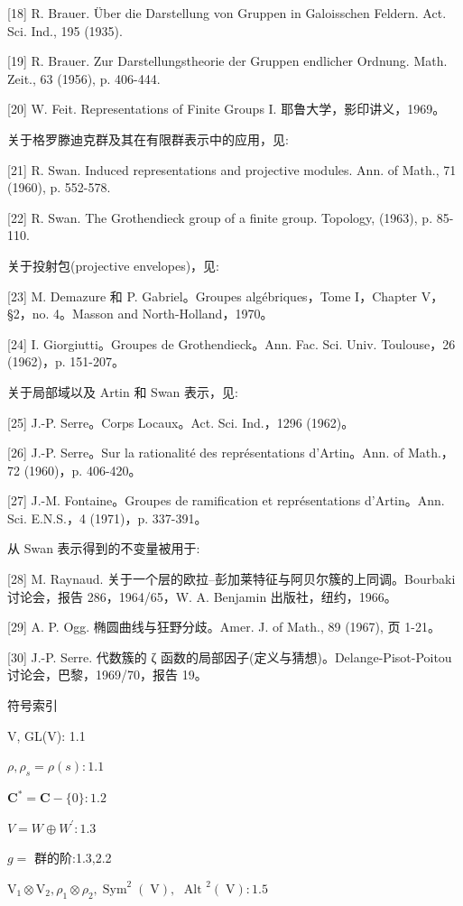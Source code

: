 \documentclass[10pt]{article}
\begin{document}
[18] R. Brauer. Über die Darstellung von Gruppen in Galoisschen Feldern. Act. Sci. Ind., 195 (1935).

[19] R. Brauer. Zur Darstellungstheorie der Gruppen endlicher Ordnung. Math. Zeit., 63 (1956), p. 406-444.

[20] W. Feit. Representations of Finite Groups I. 耶鲁大学，影印讲义，1969。

关于格罗滕迪克群及其在有限群表示中的应用，见:

[21] R. Swan. Induced representations and projective modules. Ann. of Math., 71 (1960), p. 552-578.

[22] R. Swan. The Grothendieck group of a finite group. Topology, (1963), p. 85-110.

关于投射包(projective envelopes)，见:

[23] M. Demazure 和 P. Gabriel。Groupes algébriques，Tome I，Chapter V，§2，no. 4。Masson and North-Holland，1970。

[24] I. Giorgiutti。Groupes de Grothendieck。Ann. Fac. Sci. Univ. Toulouse，26 (1962)，p. 151-207。

关于局部域以及 Artin 和 Swan 表示，见:

[25] J.-P. Serre。Corps Locaux。Act. Sci. Ind.，1296 (1962)。

[26] J.-P. Serre。Sur la rationalité des représentations d'Artin。Ann. of Math.，72 (1960)，p. 406-420。

[27] J.-M. Fontaine。Groupes de ramification et représentations d'Artin。Ann. Sci. E.N.S.，4 (1971)，p. 337-391。

从 Swan 表示得到的不变量被用于:

[28] M. Raynaud. 关于一个层的欧拉–彭加莱特征与阿贝尔簇的上同调。Bourbaki 讨论会，报告 286，1964/65，W. A. Benjamin 出版社，纽约，1966。

[29] A. P. Ogg. 椭圆曲线与狂野分歧。Amer. J. of Math., 89 (1967), 页 1-21。

[30] J.-P. Serre. 代数簇的 ζ 函数的局部因子(定义与猜想)。Delange-Pisot-Poitou 讨论会，巴黎，1969/70，报告 19。

符号索引

V, GL(V): 1.1

\(\rho ,{\rho }_{s} = \rho \left( s\right)  : {1.1}\)

\({\mathbf{C}}^{ * } = \mathbf{C} - \{ 0\}  : {1.2}\)

\(V = W \oplus  {W}^{\prime } : {1.3}\)

\(g =\) 群的阶:1.3,2.2

\({\mathrm{V}}_{1} \otimes  {\mathrm{V}}_{2},{\rho }_{1} \otimes  {\rho }_{2},{\operatorname{Sym}}^{2}\left( \mathrm{\;V}\right) , \; {\text{ Alt }}^{2}\left( \mathrm{\;V}\right)  : {1.5}\)
\end{document}
